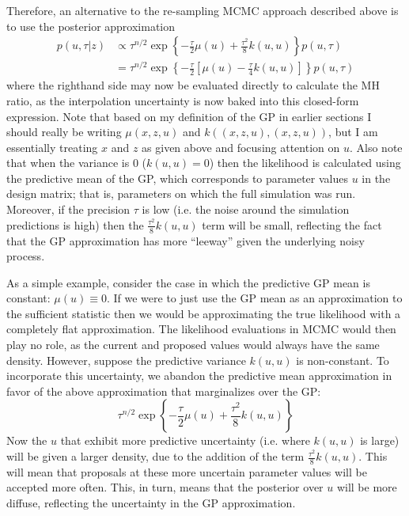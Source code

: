 \documentclass[12pt]{article}
\begin{document}
Therefore, an alternative to the re-sampling MCMC approach described above is to use the posterior approximation
\begin{align*}
p(u, \tau|z) &\propto \tau^{n/2} \exp\left\{-\frac{\tau}{2}\mu(u) + \frac{\tau^2}{8} k(u, u)\right\}p(u, \tau) \\
		 &=  \tau^{n/2} \exp\left\{-\frac{\tau}{2}\left[\mu(u) - \frac{\tau}{4} k(u, u) \right]\right\}p(u, \tau)
\end{align*}
where the righthand side may now be evaluated directly to calculate the MH ratio, as the interpolation uncertainty is now baked into this closed-form expression. Note that based on my definition of the GP in earlier sections I should really be writing $\mu(x, z, u)$ and $k((x, z, u), (x, z, u))$, but I am essentially treating $x$ and $z$ as given above and focusing attention on $u$. Also note that when the variance is 0 ($k(u, u) = 0$) then 
the likelihood is calculated using the predictive mean of the GP, which corresponds to parameter values $u$ in the design matrix; that is, parameters on which the full simulation was run. Moreover, if the precision $\tau$
is low (i.e. the noise around the simulation predictions is high) then the $\frac{\tau^2}{8} k(u, u)$ term will be small, reflecting the fact that the GP approximation has more ``leeway'' given the underlying noisy process. 

As a simple example, consider the case in which the predictive GP mean is constant: $\mu(u) \equiv 0$. If we were to just use the GP mean as an approximation to the sufficient statistic then we would be approximating the 
true likelihood with a completely flat approximation. The likelihood evaluations in MCMC would then play no role, as the current and proposed values would always have the same density. However, suppose the predictive variance $k(u, u)$ is non-constant. To incorporate this uncertainty, we abandon the predictive mean approximation in favor of the above approximation that marginalizes over the GP: 
\[ \tau^{n/2} \exp\left\{-\frac{\tau}{2} \mu(u) + \frac{\tau^2}{8} k(u, u) \right\} \]
Now the $u$ that exhibit more predictive uncertainty (i.e. where $k(u, u)$ is large) will be given a larger density, due to the addition of the term $\frac{\tau^2}{8} k(u, u)$. This will mean that proposals at these more 
uncertain parameter values will be accepted more often. This, in turn, means that the posterior over $u$ will be more diffuse, reflecting the uncertainty in the GP approximation. 
\end{document}
